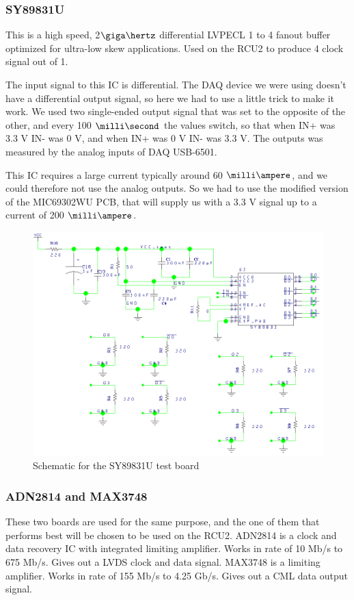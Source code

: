 \documentclass[12pt]{article}
\numberwithin{figure}{section}
\begin{document}
\subsubsection{SY89831U}
This is a high speed, 2$\giga\hertz$ differential \ac{LVPECL} 1 to 4 fanout buffer optimized for ultra-low skew applications. Used on the \ac{RCU2} to produce 4 clock signal out of 1.

The input signal to this \ac{IC} is differential. The DAQ device we were using doesn't have a differential output signal, so here we had to use a little trick to make it work.
We used two single-ended output signal that was set to the opposite of the other, and every 100 $\milli\second$ the values switch, so that when IN+ was 3.3 V IN- was 0 V, and when IN+ was 0 V IN- was 3.3 V.
The outputs was measured by the analog inputs of DAQ USB-6501.

This \ac{IC} requires a large current typically around 60 $\milli\ampere$, and we could therefore not use the analog outputs.
So we had to use the modified version of the MIC69302WU \ac{PCB}, that will supply us with a 3.3 V signal up to a current of 200 $\milli\ampere$.

\begin{figure}[!htbp]
  \centering
  \includegraphics[width=\textwidth]{SY89831U_sch.png}
  \caption{Schematic for the SY89831U test board}
  \label{SY89831U_sch}
\end{figure}
\FloatBarrier

\subsubsection{ADN2814 and MAX3748}
These two boards are used for the same purpose, and the one of them that performs best will be chosen to be used on the \ac{RCU2}.
ADN2814 is a clock and data recovery IC with integrated limiting amplifier. Works in rate of 10 Mb/s to 675 Mb/s. Gives out a \acf{LVDS} clock and data signal.
MAX3748 is a limiting amplifier. Works in rate of 155 Mb/s to 4.25 Gb/s. Gives out a \acf{CML} data output signal.
\end{document}
